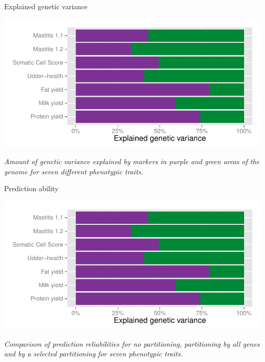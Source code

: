 \documentclass[landscape,a3paper,fontscale=0.75,margin=0.4cm]{baposter}
\begin{document}
\begin{poster}
\begin{posterbox}[name=fig1,column=1,below=problem]{Explained genetic variance}
  \begin{center}
        \includegraphics[scale=0.598,page=1]{figures} 
        
        \itshape{Amount of genetic variance explained by markers in purple and green areas of the genome for seven different phenotypic traits.}
  \end{center}
\end{posterbox}

\begin{posterbox}[name=fig2,column=2,below=problem]{Prediction ability}
  \begin{center}
        \includegraphics[scale=0.599,page=2]{figures} 
        
        \itshape{Comparison of prediction reliabilities for no partitioning, partitioning by all genes and by a selected partitioning for seven phenotypic traits.}
  \end{center}  
\end{posterbox}


\end{poster}
\end{document}
